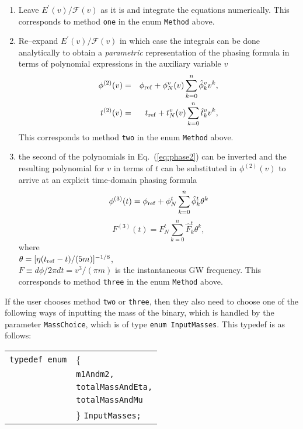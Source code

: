 \documentclass[12pt]{article}
\begin{document}
\begin{enumerate}

\item Leave  $E^{\prime}(v)/\mathcal{F}(v)$ as it is and integrate the equations numerically. This corresponds to method \texttt{one} in the enum \texttt{Method} above.

\item Re--expand $E^{\prime}(v)/\mathcal{F}(v)$ in which case the integrals can be done analytically to obtain
a {\it parametric} representation of the phasing formula in terms of
polynomial expressions in the auxiliary variable $v$
\begin {eqnarray}
\phi^{(2)}(v)&=& \phi_{\rm ref} +
\phi^v_N (v)\sum_{k=0}^{n} \hat{\phi}^v_k v^k, \nonumber\\
t^{(2)}(v)&=& t_{\rm ref} +t^v_N(v) \sum_{k=0}^{n} \hat{t}^v_k v^k,
\label{eq:phase2}
\end {eqnarray}
This corresponds to method \texttt{two} in the enum \texttt{Method} above.

\item the second of the polynomials in Eq.~(\ref{eq:phase2}) can
be inverted and the resulting polynomial for $v$ in terms of
$t$ can be substituted in $\phi^{(2)}(v)$ to arrive at an explicit  time-domain
phasing formula
\begin{equation}
\phi^{(3)}(t)=\phi_{\rm ref}+\phi_N^t \sum_{k=0}^{n}
\hat{\phi}^t_k\theta^k
\end{equation}
\begin{equation}
F^{(3)}(t)= F_N^t \sum_{k=0}^{n} \hat{F}^t_k \theta^k,
\end{equation}
where \\$\theta=[\eta (t_{\rm ref}-t)/(5m)]^{-1/8}$, \\ 
$F \equiv d \phi/ 2 \pi dt =v^3/(\pi m)$ is the instantaneous GW frequency.
This corresponds to method \texttt{three} in the enum \texttt{Method} above.

\end{enumerate}


If the user chooses method \texttt{two} or \texttt{three}, then they also need to choose one of the following ways of inputting the mass of the binary, which is handled by the parameter \texttt{MassChoice}, which is of type \texttt{enum InputMasses}. This typedef is as follows:

\vspace{5mm}

\begin{tabular}{ll}
\texttt{typedef enum} & \{ \\
                      & \texttt{m1Andm2,} \\
                      & \texttt{totalMassAndEta,}  \\
                      & \texttt{totalMassAndMu} \\
                      & \} \texttt{InputMasses;}
\end{tabular}
\end{document}
